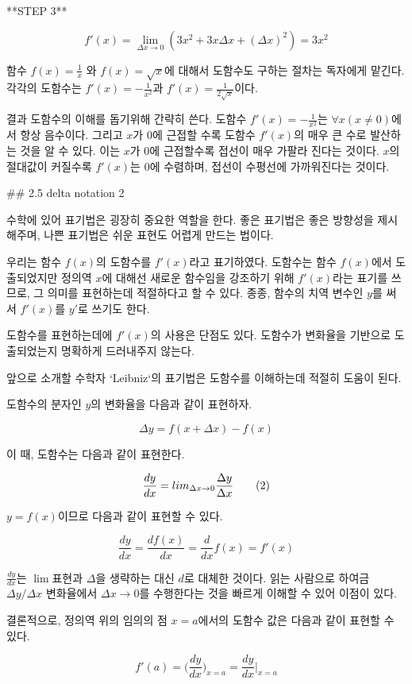 **STEP 3**

$$
f'(x) = \lim_{\Delta x \to 0}(3x^2 + 3x\Delta x + (\Delta x)^2) = 3x^2
$$

함수 $f(x) = \frac{1}{x}$ 와 $f(x) = \sqrt{x}$에 대해서 도함수도 구하는 절차는 독자에게 맡긴다.   
각각의 도함수는 $f'(x) = -\frac{1}{x^2}$과 $f'(x) = \frac{1}{2\sqrt{x}}$이다. 

결과 도함수의 이해를 돕기위해 간략히 쓴다. 도함수 $f'(x) = -\frac{1}{x^2}$는 $\forall x(x \ne 0)$에서 항상 음수이다. 그리고 $x$가 $0$에 근접할 수록 도함수 $f'(x)$의 매우 큰 수로 발산하는 것을 알 수 있다. 이는 $x$가 $0$에 근접할수록 접선이 매우 가팔라 진다는 것이다. $x$의 절대값이 커질수록 $f'(x)$는 $0$에 수렴하며, 접선이 수평선에 가까워진다는 것이다.   

## 2.5 delta notation 2  

수학에 있어 표기법은 굉장히 중요한 역할을 한다. 좋은 표기법은 좋은 방향성을 제시해주며, 나쁜 표기법은 쉬운 표현도 어렵게 만드는 법이다.  

우리는 함수 $f(x)$의 도함수를 $f'(x)$라고 표기하였다. 도함수는 함수 $f(x)$에서 도출되었지만 정의역 $x$에 대해선 새로운 함수임을 강조하기 위해 $f'(x)$라는 표기를 쓰므로, 그 의미를 표현하는데 적절하다고 할 수 있다. 종종, 함수의 치역 변수인 $y$를 써서 $f'(x)$를 $y'$로 쓰기도 한다.  

도함수를 표현하는데에 $f'(x)$의 사용은 단점도 있다. 도함수가 변화율을 기반으로 도출되었는지 명확하게 드러내주지 않는다. 

앞으로 소개할 수학자 `Leibniz`의 표기법은 도함수를 이해하는데 적절히 도움이 된다. 

도함수의 분자인 $y$의 변화율을 다음과 같이 표현하자.  

$$\Delta y = {f(x+\Delta x) - f(x)}$$

이 때, 도함수는 다음과 같이 표현한다.  

$$ 
\frac{dy}{dx} = lim_{\Delta x \to 0}\frac{\Delta y}{\Delta x}\tag2$$

$y = f(x)$이므로 다음과 같이 표현할 수 있다.  

$$
\frac{dy}{dx} =\frac{df(x)}{dx} = \frac{d}{dx}f(x) = f'(x)
$$

$\frac{dy}{dx}$는 $\lim$표현과 $\Delta$을 생략하는 대신 $d$로 대체한 것이다.   
읽는 사람으로 하여금 $\Delta y/\Delta x$ 변화율에서 $\Delta x\to 0$를 수행한다는 것을 빠르게 이해할 수 있어 이점이 있다.  

결론적으로, 정의역 위의 임의의 점 $x=a$에서의 도함수 값은 다음과 같이 표현할 수 있다.

$$
f'(a) = \Big( \frac{dy}{dx} \Big)_{x=a}  = \frac{dy}{dx} \Big|_{x=a}
$$
